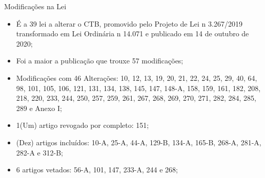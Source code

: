 \documentclass{beamer}
\begin{document}
\begin{figure}[!htb]
        \end{figure}   
\begin{frame}{Modificações na Lei}
    \begin{itemize}
        \item \justifying É a 39 lei a alterar o CTB, promovido pelo Projeto de Lei n 3.267/2019 transformado em Lei Ordinária n 14.071 e publicado em 14 de outubro de 2020;
        \item Foi a maior a publicação que trouxe 57 modificações;
        \item \justifying Modificações com 46 Alterações: 10, 12, 13, 19, 20, 21, 22, 24, 25, 29, 40, 64, 98, 101, 105, 106, 121, 131, 134, 138, 145, 147, 148-A, 158, 159, 161, 182, 208, 218, 220, 233, 244, 250, 257, 259, 261, 267, 268, 269, 270, 271, 282, 284, 285, 289 e Anexo I;
        \item  1(Um) artigo revogado por completo: 151;
        \item  {}(Dez) artigos incluídos: 10-A, 25-A, 44-A, 129-B, 134-A, 165-B, 268-A, 281-A, 282-A e 312-B;
        \item 6 artigos vetados: 56-A, 101, 147, 233-A, 244 e 268;
    \end{itemize}
\end{frame}
\end{document}
